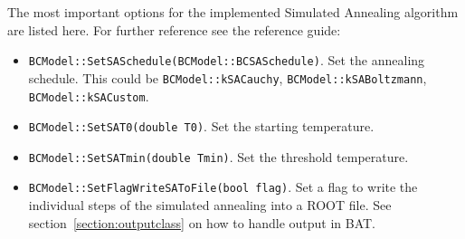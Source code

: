 \documentclass[11pt, a4paper]{article}
\begin{document}
The most important options for the implemented Simulated Annealing
algorithm are listed here. For further reference see the reference
guide:
%
\begin{itemize}
\item \verb|BCModel::SetSASchedule(BCModel::BCSASchedule)|. Set the
  annealing schedule. This could be \verb|BCModel::kSACauchy|,
  \verb|BCModel::kSABoltzmann|, \verb|BCModel::kSACustom|.
\item \verb|BCModel::SetSAT0(double T0)|. Set the starting
  temperature.
\item \verb|BCModel::SetSATmin(double Tmin)|. Set the threshold
  temperature.
\item \verb|BCModel::SetFlagWriteSAToFile(bool flag)|. Set a flag to
 write the individual steps of the simulated annealing into a ROOT
 file. See section~\ref{section:outputclass} on how to handle output in
 BAT.
\end{itemize}







\end{document}
